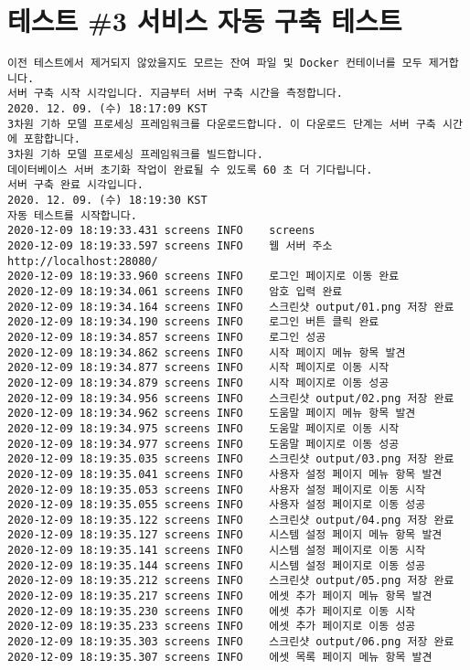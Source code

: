 \section{테스트 \#3 서비스 자동 구축 테스트}
\begin{Verbatim}[fontsize=\tiny, breaklines=true, breakanywhere=true]
이전 테스트에서 제거되지 않았을지도 모르는 잔여 파일 및 Docker 컨테이너를 모두 제거합니다.
서버 구축 시작 시각입니다. 지금부터 서버 구축 시간을 측정합니다.
2020. 12. 09. (수) 18:17:09 KST
3차원 기하 모델 프로세싱 프레임워크를 다운로드합니다. 이 다운로드 단계는 서버 구축 시간에 포함합니다.
3차원 기하 모델 프로세싱 프레임워크를 빌드합니다.
데이터베이스 서버 초기화 작업이 완료될 수 있도록 60 초 더 기다립니다.
서버 구축 완료 시각입니다.
2020. 12. 09. (수) 18:19:30 KST
자동 테스트를 시작합니다.
2020-12-09 18:19:33.431 screens	INFO	screens
2020-12-09 18:19:33.597 screens	INFO	웹 서버 주소 http://localhost:28080/
2020-12-09 18:19:33.960 screens	INFO	로그인 페이지로 이동 완료
2020-12-09 18:19:34.061 screens	INFO	암호 입력 완료
2020-12-09 18:19:34.164 screens	INFO	스크린샷 output/01.png 저장 완료
2020-12-09 18:19:34.190 screens	INFO	로그인 버튼 클릭 완료
2020-12-09 18:19:34.857 screens	INFO	로그인 성공
2020-12-09 18:19:34.862 screens	INFO	시작 페이지 메뉴 항목 발견
2020-12-09 18:19:34.877 screens	INFO	시작 페이지로 이동 시작
2020-12-09 18:19:34.879 screens	INFO	시작 페이지로 이동 성공
2020-12-09 18:19:34.956 screens	INFO	스크린샷 output/02.png 저장 완료
2020-12-09 18:19:34.962 screens	INFO	도움말 페이지 메뉴 항목 발견
2020-12-09 18:19:34.975 screens	INFO	도움말 페이지로 이동 시작
2020-12-09 18:19:34.977 screens	INFO	도움말 페이지로 이동 성공
2020-12-09 18:19:35.035 screens	INFO	스크린샷 output/03.png 저장 완료
2020-12-09 18:19:35.041 screens	INFO	사용자 설정 페이지 메뉴 항목 발견
2020-12-09 18:19:35.053 screens	INFO	사용자 설정 페이지로 이동 시작
2020-12-09 18:19:35.055 screens	INFO	사용자 설정 페이지로 이동 성공
2020-12-09 18:19:35.122 screens	INFO	스크린샷 output/04.png 저장 완료
2020-12-09 18:19:35.127 screens	INFO	시스템 설정 페이지 메뉴 항목 발견
2020-12-09 18:19:35.141 screens	INFO	시스템 설정 페이지로 이동 시작
2020-12-09 18:19:35.144 screens	INFO	시스템 설정 페이지로 이동 성공
2020-12-09 18:19:35.212 screens	INFO	스크린샷 output/05.png 저장 완료
2020-12-09 18:19:35.217 screens	INFO	에셋 추가 페이지 메뉴 항목 발견
2020-12-09 18:19:35.230 screens	INFO	에셋 추가 페이지로 이동 시작
2020-12-09 18:19:35.233 screens	INFO	에셋 추가 페이지로 이동 성공
2020-12-09 18:19:35.303 screens	INFO	스크린샷 output/06.png 저장 완료
2020-12-09 18:19:35.307 screens	INFO	에셋 목록 페이지 메뉴 항목 발견

\end{Verbatim}
